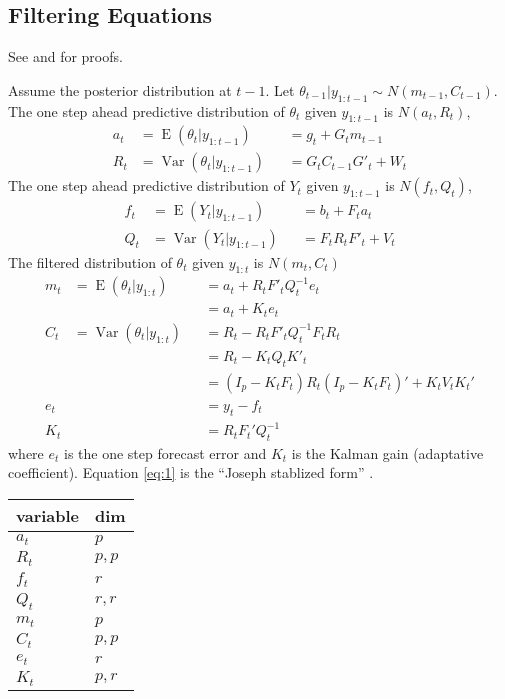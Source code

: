 \documentclass{article}\usepackage[]{graphicx}\usepackage[]{color}
\DeclareMathOperator{\E}{E}
\DeclareMathOperator{\Var}{Var}
\begin{document}
\subsection{Filtering Equations}

See \textcite[Chapter 2.7, p. 53]{PetrisPetroneEtAl2009} and \textcite[Chapter 4]{WestHarrison1997} for proofs.

Assume the posterior distribution at $t-1$. 
Let $\theta_{t-1} | y_{1:t-1} \sim N(m_{t-1}, C_{t-1})$.
The one step ahead predictive distribution of $\theta_{t}$ given $y_{1:t-1}$ is $N(a_{t}, R_{t})$,
\begin{align}
  a_{t} &= \E(\theta_{t} | y_{1:t-1}) &&= g_{t} + G_{t} m_{t-1} \\
  R_{t} &= \Var(\theta_{t} | y_{1:t-1}) &&= G_{t} C_{t-1} G'_{t} + W_{t}
\end{align}
The one step ahead predictive distribution of $Y_{t}$ given $y_{1:t-1}$ is $N(f_{t}, Q_{t})$,
\begin{align}
  f_{t} &= \E(Y_{t} | y_{1:t-1}) &&= b_{t} + F_{t} a_{t} \\
  Q_{t} &= \Var(Y_{t} | y_{1:t-1}) &&= F_{t} R_{t} F'_{t} + V_{t}
\end{align}
The filtered distribution of $\theta_{t}$ given $y_{1:t}$ is $N(m_{t}, C_{t})$
\begin{align}
  \label{eq:5}
  m_{t} &= \E(\theta_{t} | y_{1:t}) &&= a_{t} + R_{t} F'_{t} Q_{t}^{-1} e_{t} \\
  &&& = a_{t} + K_{t} e_{t} \\
  \label{eq:6}
  C_{t} &= \Var(\theta_{t} | y_{1:t}) &&= R_{t} - R_{t} F'_{t} Q_{t}^{-1} F_{t} R_{t} \\
  &&& = R_{t} - K_{t} Q_{t} K'_{t} \\
  \label{eq:1}  
  &&& = (I_{p} - K_{t} F_{t}) R_{t} (I_{p} - K_{t} F_{t})' + K_{t} V_{t} K_{t}' \\
  e_{t} &&&= y_{t} - f_{t} \\
  K_{t} &&&= R_{t} F_{t}' Q_{t}^{-1}
\end{align}
where $e_{t}$ is the one step forecast error and $K_{t}$ is the Kalman gain (adaptative coefficient).
Equation \ref{eq:1} is the ``Joseph stablized form'' \parencite[3]{Tusell2011}.

\begin{table}
  \centering
  \begin{tabular}[]{ll}
    \hline
    variable & dim \\
    \hline
    $a_{t}$ & $p$ \tabularnewline
    $R_{t}$ & $p, p$ \tabularnewline
    $f_{t}$ & $r$ \tabularnewline
    $Q_{t}$ & $r, r$ \tabularnewline
    $m_{t}$ & $p$ \tabularnewline
    $C_{t}$ & $p, p$ \tabularnewline
    $e_{t}$ & $r$ \tabularnewline
    $K_{t}$ & $p, r$ 
  \end{tabular}
  \label{Dimensions of variables in the filtering equations.}
\end{table}
\end{document}
